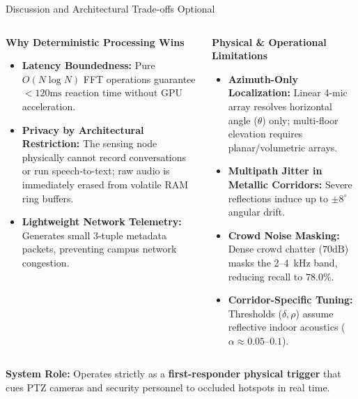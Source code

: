 \documentclass[aspectratio=169,10pt]{beamer}
\begin{document}
\begin{frame}{Discussion and Architectural Trade-offs \hfill {\small\color{gray}Optional}}
\begin{columns}[T]
\begin{block}{\textbf{Why Deterministic Processing Wins}}
\scriptsize
\begin{itemize}
    \item \textbf{Latency Boundedness:} Pure $O(N \log N)$ FFT operations guarantee $<120\text{ms}$ reaction time without GPU acceleration.
    \item \textbf{Privacy by Architectural Restriction:} The sensing node physically cannot record conversations or run speech-to-text; raw audio is immediately erased from volatile RAM ring buffers.
    \item \textbf{Lightweight Network Telemetry:} Generates small 3-tuple metadata packets, preventing campus network congestion.
\end{itemize}
\end{block}

\begin{block}{\textbf{Physical \& Operational Limitations}}
\scriptsize
\begin{itemize}
    \item \textbf{Azimuth-Only Localization:} Linear 4-mic array resolves horizontal angle ($\theta$) only; multi-floor elevation requires planar/volumetric arrays.
    \item \textbf{Multipath Jitter in Metallic Corridors:} Severe reflections induce up to $\pm 8^\circ$ angular drift.
    \item \textbf{Crowd Noise Masking:} Dense crowd chatter ($70\text{dB}$) masks the 2--4~kHz band, reducing recall to $78.0\%$.
    \item \textbf{Corridor-Specific Tuning:} Thresholds ($\delta, \rho$) assume reflective indoor acoustics ($\alpha \approx 0.05$--$0.1$).
\end{itemize}
\end{block}
\end{columns}

\vspace{0.4em}
\begin{center}
\footnotesize \textbf{System Role:} Operates strictly as a \textbf{first-responder physical trigger} that cues PTZ cameras and security personnel to occluded hotspots in real time.
\end{center}
\end{frame}
\end{document}
